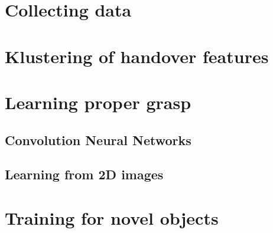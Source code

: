 \section{Collecting data}


\section{Klustering of handover features}


\section{Learning proper grasp}

\subsection{Convolution Neural Networks}

\subsection{Learning from 2D images}


\section{Training for novel objects}
